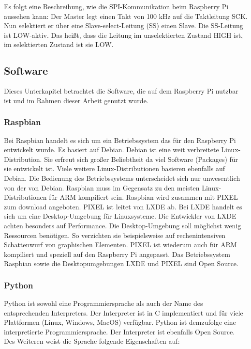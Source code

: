 Es folgt eine Beschreibung, wie die \ac{SPI}-Kommunikation beim Raspberry Pi aussehen kann: Der Master legt einen Takt von 100 kHz auf die Taktleitung SCK. Nun selektiert er über eine Slave-select-Leitung (SS) einen Slave. Die SS-Leitung ist LOW-aktiv. Das heißt, dass die Leitung im unselektierten Zustand HIGH ist, im selektierten Zustand ist sie LOW. 

 




 
\subsection{Software}
Dieses Unterkapitel betrachtet die Software, die auf dem Raspberry Pi nutzbar ist und im Rahmen dieser Arbeit genutzt wurde.
\subsubsection{Raspbian}
Bei Raspbian handelt es sich um ein Betriebssystem das für den Raspberry Pi entwickelt wurde. Es basiert auf Debian. Debian ist eine weit verbreitete Linux-Distribution. Sie erfreut sich großer Beliebtheit da viel Software (Packages) für sie entwickelt ist. Viele weitere Linux-Distributionen basieren ebenfalls auf Debian. Die Bedienung des Betriebssystems unterscheidet sich nur unwesentlich von der von Debian. Raspbian muss im Gegensatz zu den meisten Linux-Distributionen für ARM kompiliert sein. 
Raspbian wird zusammen mit \ac{PIXEL} zum download angeboten. \ac{PIXEL} ist leitet von \ac{LXDE} ab. Bei \ac{LXDE} handelt es sich um eine Desktop-Umgebung für Linuxsysteme. Die Entwickler von \ac{LXDE} achten besonders auf Performance. Die Desktop-Umgebung soll möglichst wenig Ressourcen benötigen. So verzichten sie beispielsweise auf rechenintensiven Schattenwurf von graphischen Elementen. \ac{PIXEL} ist wiederum auch für ARM kompiliert und speziell auf den Raspberry Pi angepasst. Das Betriebssystem Raspbian sowie die Desktopumgebungen \ac{LXDE} und \ac{PIXEL} sind Open Source.

\subsubsection{Python}
Python ist sowohl eine Programmiersprache als auch der Name des entsprechenden Interpreters. Der Interpreter ist in C implementiert und für viele Plattformen (Linux, Windows, MacOS) verfügbar. Python ist demzufolge eine interpretierte Programmiersprache. Der Interpreter ist ebenfalls Open Source. Des Weiteren weist die Sprache folgende Eigenschaften auf:

